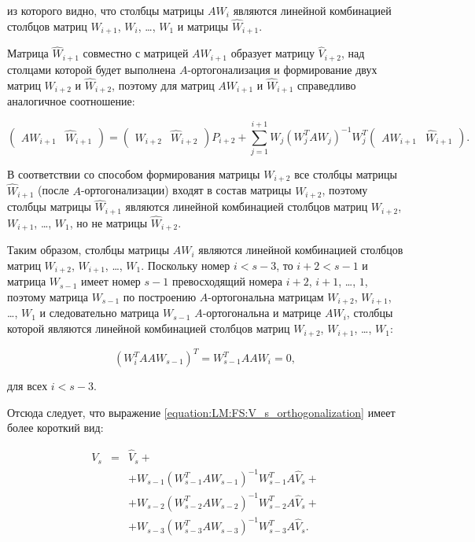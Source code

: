 из которого видно, что столбцы матрицы $A W_i$ являются линейной комбинацией столбцов матриц $W_{i+1}$, $W_i$, \dots, $W_1$ и матрицы
$\widehat{W}_{i+1}$.

Матрица $\widehat{W}_{i+1}$ совместно с матрицей $A W_{i+1}$ образует матрицу $\widehat{V}_{i+2}$, над столцами которой будет выполнена
$A$-ортогонализация и формирование двух матриц $W_{i+2}$ и $\widehat{W}_{i+2}$, поэтому для матриц $A W_{i+1}$ и $\widehat{W}_{i+1}$
справедливо аналогичное соотношение:

$$
	\begin{pmatrix}
		A W_{i+1} & \widehat{W}_{i+1}
	\end{pmatrix}
	=
	\begin{pmatrix}
		W_{i+2} & \widehat{W}_{i+2}
	\end{pmatrix}
	P_{i+2}
	+
	\sum_{j=1}^{i+1} W_j \left ( W_j^T A W_j \right ) ^{-1} W_j^T \begin{pmatrix} A W_{i+1} & \widehat{W}_{i+1} \end{pmatrix}
	.
$$

В соответствии со способом формирования матрицы $W_{i+2}$ все столбцы матрицы $\widehat{W}_{i+1}$ (после $A$-ортогонализации) входят в
состав матрицы $W_{i+2}$, поэтому столбцы матрицы $\widehat{W}_{i+1}$ являются линейной комбинацией столбцов матриц $W_{i+2}$,
$W_{i+1}$, \dots, $W_1$, но не матрицы $\widehat{W}_{i+2}$.

Таким образом, столбцы матрицы $A W_i$ являются линейной комбинацией столбцов матриц $W_{i+2}$, $W_{i+1}$, \dots, $W_1$. Поскольку номер
$i < s-3$, то $i+2 < s-1$ и матрица $W_{s-1}$ имеет номер $s-1$ превосходящий номера $i+2$, $i+1$, \dots, $1$, поэтому матрица
$W_{s-1}$ по построению $A$-ортогональна матрицам $W_{i+2}$, $W_{i+1}$, \dots, $W_1$ и следовательно матрица $W_{s-1}$
$A$-ортогональна и матрице $A W_i$, столбцы которой являются линейной комбинацией столбцов матриц $W_{i+2}$, $W_{i+1}$, \dots, $W_1$:

$$
	\left ( W_i^T A A W_{s-1} \right ) ^T = W_{s-1}^T A A W_i = 0,
$$

для всех $i < s-3$.

Отсюда следует, что выражение \ref{equation:LM:FS:V_s_orthogonalization} имеет более короткий вид:

$$
	\begin{array}{ccl}
		V_s & = & \widehat{V}_s + \\
	        &   & + W_{s-1} \left ( W_{s-1}^T A W_{s-1} \right ) ^{-1} W_{s-1}^T A \widehat{V}_s + \\
	        &   & + W_{s-2} \left ( W_{s-2}^T A W_{s-2} \right ) ^{-1} W_{s-2}^T A \widehat{V}_s + \\
	        &   & + W_{s-3} \left ( W_{s-3}^T A W_{s-3} \right ) ^{-1} W_{s-3}^T A \widehat{V}_s.
	\end{array}
$$

